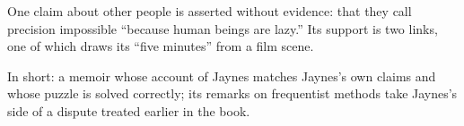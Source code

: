 \begin{afterword}
One claim about other people is asserted without evidence: that they call precision impossible ``because human beings are lazy.'' Its support is two links, one of which draws its ``five minutes'' from a film scene.

In short: a memoir whose account of Jaynes matches Jaynes's own claims and whose puzzle is solved correctly; its remarks on frequentist methods take Jaynes's side of a dispute treated earlier in the book.
\end{afterword}
